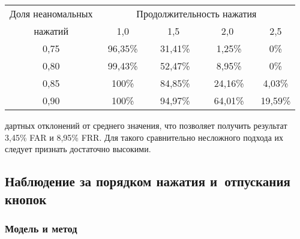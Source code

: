 \begin{multicols}{2}
\begin{center}
\vspace*{6pt}
        

 
{\small                \tabcolsep=1.5pt
                \begin{tabular}{|c|c|c|c|c|}
                               \hline
        Доля неаномальных   &\multicolumn{4}{c|}{ Продолжительность нажатия}\\
         \cline{2-5}
 нажатий& \ \ \ 1,0\ \ \  & \ \ \ 1,5 \ \ \  & \ \ \ 2,0 \ \ \   & 2,5     \\
                \hline
                    0,75 & 96,35\% & 31,41\% & \hphantom{9}1,25\%  & 0\%\hphantom{,99}  \\
                    0,80 & 99,43\% & 52,47\% & \hphantom{9}8,95\%  & 0\%\hphantom{,99} \\
                    0,85 & 100\%\hphantom{,999}   & 84,85\% & 24,16\% & 4,03\%  \\
                    0,90 & 100\%\hphantom{,999}   & 94,97\% & 64,01\% & 19,59\%\hphantom{9} \\
                                    \hline
                \end{tabular}
                }
            \end{center}

        \addtocounter{table}{2}
        
        \vspace*{6pt}


\noindent
дартных отклонений от среднего значения, что позволяет получить
результат 3,45\% FAR и 8,95\% FRR. Для такого сравнительно
несложного подхода их следует признать достаточно высокими.

\vspace*{-4pt}

\subsection {Наблюдение за порядком нажатия и~отпускания кнопок}

\vspace*{-2pt}

\subsubsection{Модель и метод}


\end{multicols}
